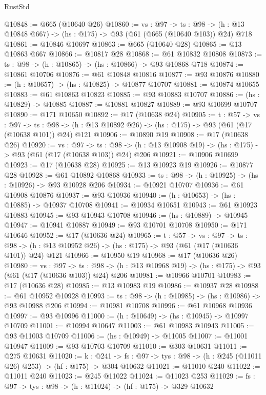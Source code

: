 \begin{lexlean}{RustStd}
\begin{coremodule}
@10848 := @665 (@10640 @26)
@10860 := {vs : @97} ->
  {ts : @98} -> (h : @13 @10848 @667) -> (hs : @175) -> @93 (@61 (@665 (@10640 @103)) @24) @718
@10861 := @10846 @10697
@10863 := @665 (@10640 @28)
@10865 := @13 @10863 @667
@10866 := @10817 @28
@10868 := @61 @10832 @10808
@10873 := {ts : @98} -> (h : @10865) -> (hs : @10866) -> @93 @10868 @718
@10874 := @10861 @10706
@10876 := @61 @10848 @10816
@10877 := @93 @10876
@10880 := (h : @10657) -> (hs : @10825) -> @10877 @10707
@10881 := @10874 @10655
@10883 := @61 @10863 @10823
@10885 := @93 @10883 @10707
@10886 := (hs : @10829) -> @10885
@10887 := @10881 @10827
@10889 := @93 @10699 @10707
@10890 := @171 @10650
@10892 := @17 (@10638 @24)
@10905 := {t : @57} ->
  {vs : @97} ->
  {ts : @98} -> (h : @13 @10892 @26) -> (hs : @175) -> @93 (@61 (@17 (@10638 @101)) @24) @121
@10906 := @10890 @19
@10908 := @17 (@10638 @26)
@10920 := {vs : @97} ->
  {ts : @98} -> (h : @13 @10908 @19) -> (hs : @175) -> @93 (@61 (@17 (@10638 @103)) @24) @206
@10921 := @10906 @10699
@10923 := @17 (@10638 @28)
@10925 := @13 @10923 @19
@10926 := @10877 @28
@10928 := @61 @10892 @10868
@10933 := {ts : @98} -> (h : @10925) -> (hs : @10926) -> @93 @10928 @206
@10934 := @10921 @10707
@10936 := @61 @10908 @10876
@10937 := @93 @10936
@10940 := (h : @10653) -> (hs : @10885) -> @10937 @10708
@10941 := @10934 @10651
@10943 := @61 @10923 @10883
@10945 := @93 @10943 @10708
@10946 := (hs : @10889) -> @10945
@10947 := @10941 @10887
@10949 := @93 @10701 @10708
@10950 := @171 @10646
@10952 := @17 (@10636 @24)
@10965 := {t : @57} ->
  {vs : @97} ->
  {ts : @98} -> (h : @13 @10952 @26) -> (hs : @175) -> @93 (@61 (@17 (@10636 @101)) @24) @121
@10966 := @10950 @19
@10968 := @17 (@10636 @26)
@10980 := {vs : @97} ->
  {ts : @98} -> (h : @13 @10968 @19) -> (hs : @175) -> @93 (@61 (@17 (@10636 @103)) @24) @206
@10981 := @10966 @10701
@10983 := @17 (@10636 @28)
@10985 := @13 @10983 @19
@10986 := @10937 @28
@10988 := @61 @10952 @10928
@10993 := {ts : @98} -> (h : @10985) -> (hs : @10986) -> @93 @10988 @206
@10994 := @10981 @10708
@10996 := @61 @10968 @10936
@10997 := @93 @10996
@11000 := (h : @10649) -> (hs : @10945) -> @10997 @10709
@11001 := @10994 @10647
@11003 := @61 @10983 @10943
@11005 := @93 @11003 @10709
@11006 := (hs : @10949) -> @11005
@11007 := @11001 @10947
@11009 := @93 @10703 @10709
@11010 := @303 @10631
@11011 := @275 @10631
@11020 := {k : @241} ->
  {fs : @97} -> {tys : @98} -> (h : @245 (@11011 @26) @253) -> (hf : @175) -> @304 @10632
@11021 := @11010 @240
@11022 := @11011 @240
@11023 := @245 @11022
@11024 := @11023 @253
@11029 := {fs : @97} -> {tys : @98} -> (h : @11024) -> (hf : @175) -> @329 @10632

\end{coremodule}
\end{lexlean}
